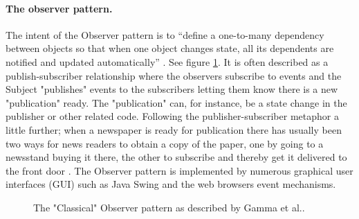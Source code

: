 \documentclass[english]{ifimaster}
\begin{document}
\paragraph{The observer pattern.}
\label{sec:observerPattern}
The intent of the Observer pattern is to “define a one-to-many dependency between objects so that when one object changes state, all its dependents are notified and updated automatically” \parencite[p. 9]{gamma}. See figure \ref{fig:classicalObserver}. It is often described as a publish-subscriber relationship where the observers subscribe to events and the Subject "publishes" events to the subscribers letting them know there is a new "publication" ready. The "publication" can, for instance, be a state change in the publisher or other related code. Following the publisher-subscriber metaphor a little further; when a newspaper is ready for publication there has usually been two ways for news readers to obtain a copy of the paper, one by going to a newsstand buying it there, the other to subscribe and thereby get it delivered to the front door \parencite[p. 171-174]{stefanov}. The Observer pattern is implemented by numerous graphical user interfaces (GUI) such as Java Swing and the web browsers event mechanisms.

\begin{figure}
\centering

\caption{The "Classical" Observer pattern as described by Gamma et al.\parencite{gamma}.} \label{fig:classicalObserver}

\end{figure}

\end{document}
